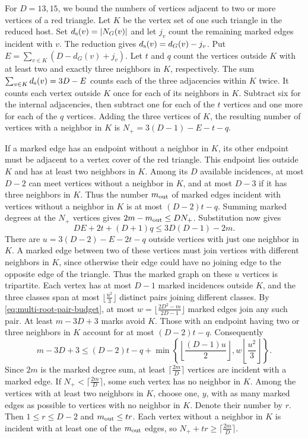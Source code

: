 \documentclass[preprint,11pt,numbers]{elsarticle-arxiv}
\numberwithin{equation}{section}
\theoremstyle{definition}
\begin{document}
For $D=13,15$, we bound the numbers of vertices adjacent to
two or more vertices of a red triangle. Let $K$ be the vertex set
of one such triangle in the reduced host. Set
$d_{\rm s}(v)=|N_G(v)|$ and let $j_v$ count the remaining marked
edges incident with $v$. The reduction gives $d_{\rm s}(v)=d_G(v)-j_v$.
Put $E=\sum_{v\in K}(D-d_G(v)+j_v)$. Let $t$ and $q$ count
the vertices outside $K$ with at least two and exactly three
neighbors in $K$, respectively. The sum $\sum_{v\in K}d_{\rm s}(v)
=3D-E$ counts each of the three adjacencies within $K$ twice.
It counts each vertex outside $K$ once for each of its neighbors
in $K$. Subtract six for the internal adjacencies, then subtract
one for each of the $t$ vertices and one more for each of the
$q$ vertices. Adding the three vertices of $K$, the resulting
number of vertices with a neighbor in $K$ is
$N_+=3(D-1)-E-t-q$.

If a marked edge has an endpoint without a neighbor in $K$, its
other endpoint must be adjacent to a vertex cover of the red
triangle. This endpoint lies outside $K$ and has at least two
neighbors in $K$. Among its $D$ available incidences, at most
$D-2$ can meet vertices without a neighbor in $K$, and at most
$D-3$ if it has three neighbors in $K$. Thus the number
$m_{\rm out}$ of marked edges incident with vertices without a
neighbor in $K$ is at most $(D-2)t-q$. Summing marked degrees at
the $N_+$ vertices gives $2m-m_{\rm out}\leq DN_+$. Substitution
now gives
\[
 DE+2t+(D+1)q\le 3D(D-1)-2m.
\]
There are $u=3(D-2)-E-2t-q$ outside vertices with just one neighbor
in $K$. A marked edge between two of these vertices must join vertices
with different neighbors in $K$, since otherwise their edge could
have no joining edge to the opposite edge of the triangle. Thus the
marked graph on these $u$ vertices is tripartite. Each vertex has at
most $D-1$ marked incidences outside $K$, and the three classes span
at most $\lfloor\frac{u^2}{3}\rfloor$ distinct pairs joining different classes.
By \eqref{eq:multi-root-pair-budget}, at most
$w=\lfloor\frac{2D^2-m}{2D-1}\rfloor$ marked edges join any such pair.
At least $m-3D+3$ marks avoid $K$. Those with an endpoint having two
or three neighbors in $K$ account for at most $(D-2)t-q$. Consequently
\[
 m-3D+3\le (D-2)t-q+
 \min\left\{\left\lfloor\frac{(D-1)u}{2}\right\rfloor,
                  w\left\lfloor\frac{u^2}{3}\right\rfloor\right\}.
\]
Since $2m$ is the marked degree sum, at least
$\lceil\frac{2m}{D}\rceil$ vertices are incident with a marked
edge. If $N_+<\lceil\frac{2m}{D}\rceil$, some such vertex has
no neighbor in $K$. Among the vertices with at least two neighbors
in $K$, choose one, $y$, with as many marked edges as possible to
vertices with no neighbor in $K$. Denote their number by $r$.
Then $1\leq r\leq D-2$ and $m_{\rm out}\leq tr$. Each vertex
without a neighbor in $K$ is incident with at least one of the
$m_{\rm out}$ edges, so $N_++tr\geq\lceil\frac{2m}{D}\rceil$.
\end{document}
